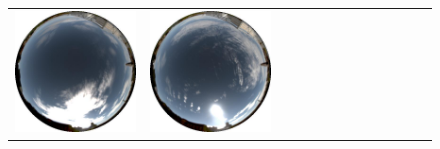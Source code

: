 \begin{figure}
\begin{tabular}{@{}rcccccccccccc@{}}
    \includegraphics[width=\customwidth]{./figures/database/20131106_125937.jpg} &
    \includegraphics[width=\customwidth]{./figures/database/20131106_132936.jpg} &

\end{tabular}
\end{figure}
